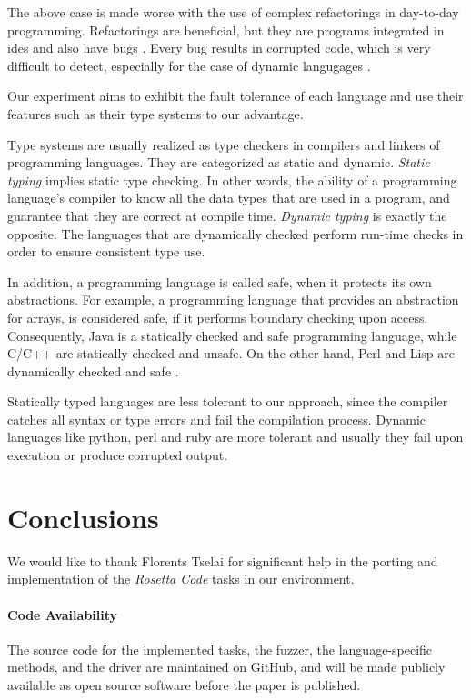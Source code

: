 \documentclass[10pt]{sigplanconf}
\begin{document}
The above case is made worse with the use of complex refactorings \cite{Fow00} in day-to-day programming. Refactorings are beneficial, but they are programs integrated in {\sc ide}s and also have bugs \cite{DDGM07}. Every bug results in corrupted code, which is very difficult to detect, especially for the case of dynamic langugages \cite{SCHA12,FFM11}.

Our experiment aims to exhibit the fault tolerance \cite{LYU95,KOKR07} of each language and use their features such as 
their type systems to our advantage. 

Type systems are usually realized as type checkers in compilers and linkers of programming languages. They are categorized as static and dynamic. \textit{Static typing} implies static type checking. In other words, the ability of a programming language's compiler to know all the data types that are used in a program, and guarantee that they are correct at compile time. \textit{Dynamic typing} is exactly the opposite. The languages that are dynamically checked perform run-time checks in order to ensure consistent type use. 

In addition, a programming language is called safe, when it protects its own abstractions. For example, a programming language that provides an abstraction for arrays, is considered safe, if it performs boundary checking upon access. Consequently, Java is a statically checked and safe programming language, while C/C++ are statically checked and unsafe. On the other hand, Perl and Lisp are dynamically checked and safe \cite{Pie02}.

Statically typed languages are less tolerant to our approach, since the compiler catches all syntax or type errors and fail the compilation process. Dynamic languages like python, perl and ruby are more tolerant and usually they fail upon execution or produce corrupted output.

\section{Conclusions} %
\label{sec:conclusions}


\acks

We would like to thank Florents Tselai for significant
help in the porting and implementation of the
{\em Rosetta Code} tasks in our environment.


\paragraph{Code Availability} The source code for
the implemented tasks,
the fuzzer,
the language-specific methods, and
the driver are maintained on GitHub, and
will be made publicly available as open source software
before the paper is published.
\end{document}
